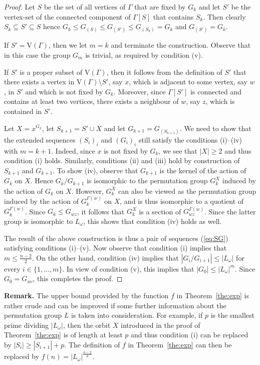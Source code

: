 \documentclass{amsart}
\theoremstyle{definition}
\begin{document}
\begin{proof}
Let $S$ be the set of all vertices of $\Gamma$ that are fixed by $G_k$ and let $S'$ be the vertex-set of the connected component of $\Gamma[S]$ that contains $S_k$. Then clearly $S_k\subseteq S'\subseteq S$ hence $G_k\leq G_{(S)}\leq G_{(S')}\leq G_{(S_k)}=G_k$ and $G_{(S')} = G_k$.

If $S' = {\mathrm V}(\Gamma)$, then we let $m=k$ and terminate the construction. Observe that in this case the group $G_m$ is trivial, as required by condition (v).

If $S'$ is a proper subset of ${\mathrm V}(\Gamma)$, then it follows from the definition of $S'$ that there exists a vertex in ${\mathrm V}(\Gamma)\setminus S'$, say $x$, which is adjacent to some vertex, say $w$, in  $S'$ and which is not fixed by $G_k$. Moreover, since $\Gamma[S']$ is  connected and contains at least two vertices, there exists a neighbour of $w$, say $z$, which is contained in $S'$. 

Let $X=x^{G_k}$, let $S_{k+1} = S' \cup X$ and let $G_{k+1} = G_{(S_{k+1})}$. We need to show that the extended sequences $(S_i)_i$ and $(G_i)_i$ still satisfy the conditions (i)--(iv) with $m=k+1$. Indeed, since $x$ is not fixed by $G_k$, we see that $|X|\ge 2$ and thus condition (i) holds. Similarly, conditions (ii) and (iii) hold by construction of $S_{k+1}$ and $G_{k+1}$. To show (iv), observe that $G_{k+1}$ is the kernel of the action of $G_k$ on $X$. Hence  $G_{k}/G_{k+1}$ is isomorphic to the permutation group $G_k^X$ induced by the action of $G_k$ on $X$. However, $G_k^X$ can also be viewed as the permutation group induced by the action of $G_k^{\Gamma(w)}$ on $X$, and is thus isomorphic to a quotient of $G_k^{\Gamma(w)}$. Since $G_k \le G_{wz}$, it follows that $G_k^X$ 
is a section of $G_{wz}^{\Gamma(w)}$. Since the latter group is isomorphic to $L_\omega$, this shows that condition (iv) holds as well.

The result of the above construction is thus a pair of sequences (\ref{eq:SG}) satisfying conditions (i)--(v). Now observe that condition (i) implies that $m\le \frac{n-2}{2}$. On the other hand, condition (iv) implies that $|G_i/G_{i+1}| \le |L_\omega|$ for every $i\in \{1,\ldots,m\}$. In view of condition (v), this implies that $|G_0| \le |L_\omega|^m$. Since $G_0 = G_{uv}$, this completes the proof.
\end{proof}

\noindent\textbf{Remark.}
The upper bound provided by the function $f$ in Theorem~\ref{the:exp} is rather crude and can be improved if some further information about the permutation group $L$ is taken into consideration. For example, if $p$ is the smallest prime dividing $|L_\omega|$, then the orbit $X$ introduced in the proof of Theorem~\ref{the:exp} is of length at least $p$ and thus condition (i) can be replaced by $|S_{i}| \ge |S_{i+1}| + p$. The definition of $f$ in Theorem~\ref{the:exp} can then be replaced by $f(n)=|L_\omega|^\frac{n-2}{p}$.
\end{document}
